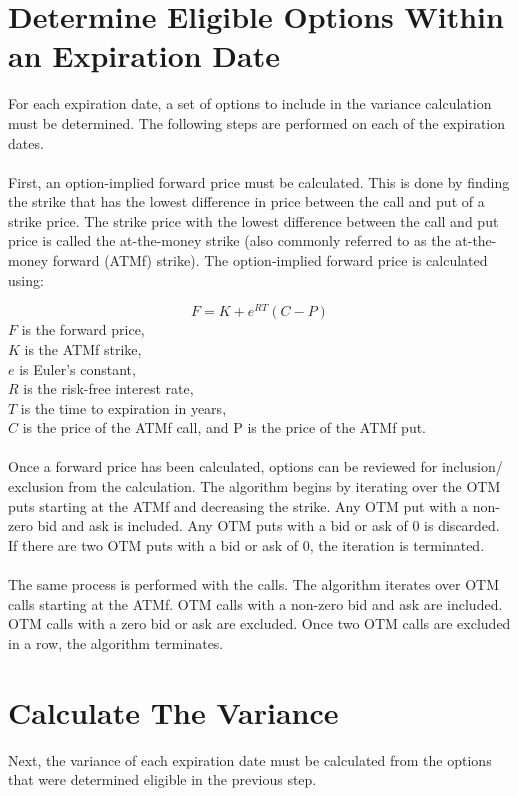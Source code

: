 \documentclass[11pt, oneside]{book}
\begin{document}
\section{Determine Eligible Options Within an Expiration Date} \label{CalcVix-DetermineEligible}
For each expiration date, a set of options to include in the variance calculation must be determined. The following steps are performed on each of the expiration dates.\\
\\
First, an option-implied forward price must be calculated. This is done by finding the strike that has the lowest difference in price between the call and put of a strike price. The strike price with the lowest difference between the call and put price is called the at-the-money strike (also commonly referred to as the at-the-money forward (ATMf) strike). The option-implied forward price is calculated using:

\begin{equation} 
F=K+e^{RT}(C-P)
\end{equation}\label{Eq-ATMf}
$F$ is the forward price,\\
$K$ is the ATMf strike,\\
$e$ is Euler's constant,\\
$R$ is the risk-free interest rate,\\
$T$ is the time to expiration in years,\\
$C$ is the price of the ATMf call, and P is the price of the ATMf put.\\
\\
Once a forward price has been calculated, options can be reviewed for inclusion/ exclusion from the calculation. The algorithm begins by iterating over the OTM puts starting at the ATMf and decreasing the strike. Any OTM put with a non-zero bid and ask is included. Any OTM puts with a bid or ask of 0 is discarded. If there are two OTM puts with a bid or ask of 0, the iteration is terminated.\\
\\
The same process is performed with the calls. The algorithm iterates over OTM calls starting at the ATMf. OTM calls with a non-zero bid and ask are included. OTM calls with a zero bid or ask are excluded. Once two OTM calls are excluded in a row, the algorithm terminates.

\section{Calculate The Variance} \label{CalcVix-CalcVariance}
Next, the variance of each expiration date must be calculated from the options that were determined eligible in the previous step.
\end{document}
